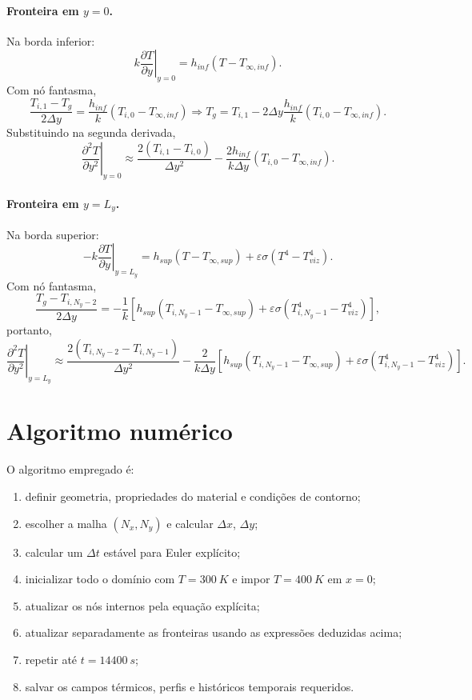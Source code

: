 \documentclass[12pt,a4paper]{article}
\begin{document}
\paragraph{Fronteira em $y=0$.}
Na borda inferior:
\begin{equation}
k\left.\frac{\partial T}{\partial y}\right|_{y=0} = h_{inf}(T-T_{\infty,inf}).
\end{equation}
Com nó fantasma,
\begin{equation}
\frac{T_{i,1}-T_g}{2\Delta y}=\frac{h_{inf}}{k}(T_{i,0}-T_{\infty,inf})
\Rightarrow
T_g=T_{i,1}-2\Delta y\frac{h_{inf}}{k}(T_{i,0}-T_{\infty,inf}).
\end{equation}
Substituindo na segunda derivada,
\begin{equation}
\left.\frac{\partial^2 T}{\partial y^2}\right|_{y=0}
\approx
\frac{2(T_{i,1}-T_{i,0})}{\Delta y^2}
-
\frac{2h_{inf}}{k\Delta y}(T_{i,0}-T_{\infty,inf}).
\end{equation}

\paragraph{Fronteira em $y=L_y$.}
Na borda superior:
\begin{equation}
-k\left.\frac{\partial T}{\partial y}\right|_{y=L_y}
=
 h_{sup}(T-T_{\infty,sup}) + \varepsilon\sigma(T^4-T_{viz}^4).
\end{equation}
Com nó fantasma,
\begin{equation}
\frac{T_g-T_{i,N_y-2}}{2\Delta y}
=
-
\frac{1}{k}
\left[
 h_{sup}(T_{i,N_y-1}-T_{\infty,sup}) + \varepsilon\sigma(T_{i,N_y-1}^4-T_{viz}^4)
\right],
\end{equation}
portanto,
\begin{equation}
\left.\frac{\partial^2 T}{\partial y^2}\right|_{y=L_y}
\approx
\frac{2(T_{i,N_y-2}-T_{i,N_y-1})}{\Delta y^2}
-
\frac{2}{k\Delta y}
\left[
 h_{sup}(T_{i,N_y-1}-T_{\infty,sup}) + \varepsilon\sigma(T_{i,N_y-1}^4-T_{viz}^4)
\right].
\end{equation}

\section{Algoritmo numérico}
O algoritmo empregado é:
\begin{enumerate}
    \item definir geometria, propriedades do material e condições de contorno;
    \item escolher a malha $(N_x,N_y)$ e calcular $\Delta x$, $\Delta y$;
    \item calcular um $\Delta t$ estável para Euler explícito;
    \item inicializar todo o domínio com $T=\SI{300}{K}$ e impor $T=\SI{400}{K}$ em $x=0$;
    \item atualizar os nós internos pela equação explícita;
    \item atualizar separadamente as fronteiras usando as expressões deduzidas acima;
    \item repetir até $t=\SI{14400}{s}$;
    \item salvar os campos térmicos, perfis e históricos temporais requeridos.
\end{enumerate}
\end{document}
